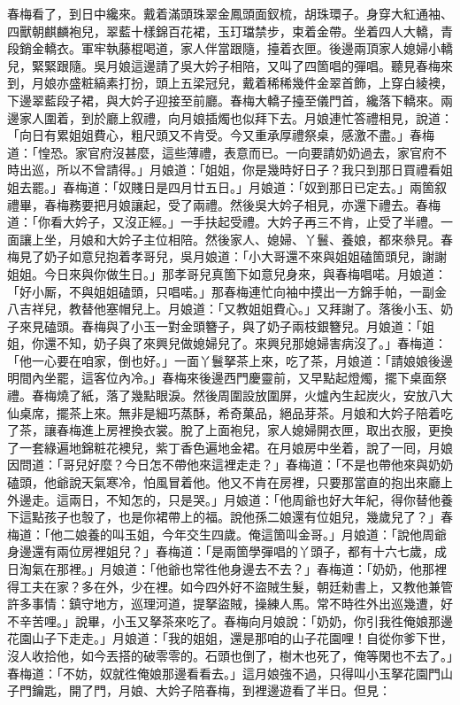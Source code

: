 春梅看了，到日中纔來。戴着滿頭珠翠金鳳頭面釵梳，胡珠環子。身穿大紅通袖、四獸朝麒麟袍兒，翠藍十樣錦百花裙，玉玎璫禁步，束着金帶。坐着四人大轎，青段銷金轎衣。軍牢執藤棍喝道，家人伴當跟隨，擡着衣匣。後邊兩頂家人媳婦小轎兒，緊緊跟隨。{}吳月娘這邊請了吳大妗子相陪，又叫了四箇唱的彈唱。聽見春梅來到，月娘亦盛粧縞素打扮，頭上五梁冠兒，戴着稀稀幾件金翠首飾，{}上穿白綾襖，下邊翠藍段子裙，與大妗子迎接至前廳。春梅大轎子擡至儀門首，纔落下轎來。兩邊家人圍着，到於廳上叙禮，向月娘插燭也似拜下去。月娘連忙答禮相見，說道：「向日有累姐姐費心，粗尺頭又不肯受。今又重承厚禮祭桌，感激不盡。」春梅道：「惶恐。家官府沒甚麼，這些薄禮，表意而已。一向要請奶奶過去，家官府不時出巡，所以不曾請得。」月娘道：「姐姐，你是幾時好日子？我只到那日買禮看姐姐去罷。」{}春梅道：「奴賤日是四月廿五日。」月娘道：「奴到那日已定去。」兩箇叙禮畢，春梅務要把月娘讓起，受了兩禮。然後吳大妗子相見，亦還下禮去。春梅道：「你看大妗子，又沒正經。」一手扶起受禮。大妗子再三不肯，止受了半禮。一面讓上坐，月娘和大妗子主位相陪。然後家人、媳婦、丫鬟、養娘，都來叅見。春梅見了奶子如意兒抱着孝哥兒，吳月娘道：「小大哥還不來與姐姐磕箇頭兒，謝謝姐姐。今日來與你做生日。」那孝哥兒真箇下如意兒身來，與春梅唱喏。月娘道：「好小厮，不與姐姐磕頭，只唱喏。」那春梅連忙向袖中摸出一方錦手帕，一副金八吉祥兒，教替他塞帽兒上。月娘道：「又教姐姐費心。」又拜謝了。落後小玉、奶子來見磕頭。春梅與了小玉一對金頭簪子，{}與了奶子兩枝銀簪兒。月娘道：「姐姐，你還不知，奶子與了來興兒做媳婦兒了。來興兒那媳婦害病沒了。」春梅道：「他一心要在咱家，倒也好。」{}一面丫鬟拏茶上來，吃了茶，月娘道：「請娘娘後邊明間內坐罷，這客位內冷。」春梅來後邊西門慶靈前，又早點起燈燭，擺下桌面祭禮。春梅燒了紙，落了幾點眼淚。{}然後周圍設放圍屏，火爐內生起炭火，安放八大仙桌席，擺茶上來。無非是細巧蒸酥，希奇菓品，絕品芽茶。月娘和大妗子陪着吃了茶，讓春梅進上房裡換衣裳。脫了上面袍兒，家人媳婦開衣匣，取出衣服，更換了一套綠遍地錦粧花襖兒，紫丁香色遍地金裙。在月娘房中坐着，說了一囘，月娘因問道：「哥兒好麼？今日怎不帶他來這裡走走？」春梅道：「不是也帶他來與奶奶磕頭，他爺說天氣寒冷，怕風冒着他。他又不肯在房裡，只要那當直的抱出來廳上外邊走。{}這兩日，不知怎的，只是哭。」月娘道：「他周爺也好大年紀，得你替他養下這點孩子也彀了，也是你裙帶上的福。說他孫二娘還有位姐兒，幾歲兒了？」春梅道：「他二娘養的叫玉姐，今年交生四歲。俺這箇叫金哥。」月娘道：「說他周爺身邊還有兩位房裡姐兒？」春梅道：「是兩箇學彈唱的丫頭子，都有十六七歲，成日淘氣在那裡。」月娘道：「他爺也常徃他身邊去不去？」{}春梅道：「奶奶，他那裡得工夫在家？多在外，少在裡。如今四外好不盜賊生髮，朝廷勑書上，又教他兼管許多事情：鎮守地方，巡理河道，提拏盜賊，操練人馬。常不時徃外出巡幾遭，好不辛苦哩。」說畢，小玉又拏茶來吃了。春梅向月娘說：「奶奶，你引我徃俺娘那邊花園山子下走走。」月娘道：「我的姐姐，還是那咱的山子花園哩！自從你爹下世，沒人收拾他，如今丟搭的破零零的。石頭也倒了，樹木也死了，俺等閑也不去了。」春梅道：「不妨，奴就徃俺娘那邊看看去。」這月娘強不過，只得叫小玉拏花園門山子門鑰匙，開了門，月娘、大妗子陪春梅，到裡邊遊看了半日。但見：

